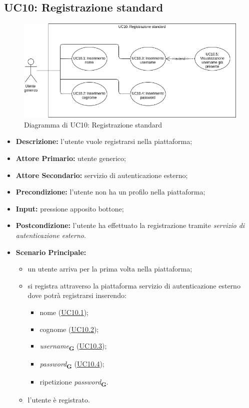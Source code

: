 \subsection{UC10: Registrazione standard}
\label{sec:UC10}
\begin{figure}[!ht]
    \caption{Diagramma di UC10: Registrazione standard}
    \vspace{10px}
    \includegraphics[scale=0.5]{../../../Images/AnalisiRequisiti/UC10}
    \centering
\end{figure}
\begin{itemize}
    \item \textbf{Descrizione:} l'utente vuole registrarsi nella piattaforma;
    \item \textbf{Attore Primario:} utente generico;
    \item \textbf{Attore Secondario:} servizio di autenticazione esterno;
    \item \textbf{Precondizione:} l'utente non ha un profilo nella piattaforma;
    \item \textbf{Input:} pressione apposito bottone;
    \item \textbf{Postcondizione:} l'utente ha effettuato la registrazione tramite \textit{servizio di autenticazione esterno}. 
    \item \textbf{Scenario Principale:}
    \begin{itemize}
        \item un utente arriva per la prima volta nella piattaforma;
        \item si registra attraverso la piattaforma servizio di autenticazione esterno dove potrà registrarsi inserendo:
        \begin{itemize}
            \item nome (\hyperref[sec:UC10.1]{\underline{UC10.1}});
            \item cognome (\hyperref[sec:UC10.2]{\underline{UC10.2}});
            \item \textit{username}\textsubscript{\textbf{G}} (\hyperref[sec:UC10.3]{\underline{UC10.3}});
            \item \textit{password}\textsubscript{\textbf{G}} (\hyperref[sec:UC10.4]{\underline{UC10.4}});
            \item ripetizione \textit{password}\textsubscript{\textbf{G}}.
        \end{itemize}
        \item l'utente è registrato.
    \end{itemize} 
\end{itemize}

